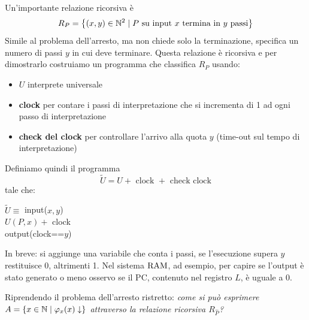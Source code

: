 Un'importante relazione ricorsiva è
$$ R_P = \left\{(x,y) \in \mathbb{N}^2 \mid P \text{ su input } x \text{ termina in } y \text{ passi}\right\} $$
Simile al problema dell'arresto, ma non chiede solo la terminazione, specifica un numero di passi $y$ in cui deve terminare. Questa relazione è ricorsiva e per dimostrarlo costruiamo un programma che classifica $R_P$ usando:
\begin{itemize}
	\item $U$ interprete universale
	\item \textbf{clock} per contare i passi di interpretazione che si incrementa di 1 ad ogni passo di interpretazione
	\item \textbf{check del clock} per controllare l'arrivo alla quota $y$ (time-out sul tempo di interpretazione)
\end{itemize}

Definiamo quindi il programma
$$ \tilde U = U + \text{ clock } + \text{ check clock}$$
tale che:
\begin{center}
	\begin{minipage}{.85\textwidth}
		\begin{tcolorbox}[colback=white,sharp corners,boxrule=.3mm]
\begin{algorithm}[H]
    \SetAlgoNoEnd
    \SetInd{1em}{1em}

    $\tilde U \equiv$ input($x,y$) \\
    $U(P,x) + $ clock \\
    output(clock==$y$) \\
\end{algorithm}

		\end{tcolorbox}
	\end{minipage}
\end{center}

In breve: si aggiunge una variabile che conta i passi, se l'esecuzione supera $y$ restituisce 0, altrimenti 1. Nel sistema $\text{RAM}$, ad esempio, per capire se l'output è stato generato o meno osservo se il PC, contenuto nel registro $L$, è uguale a 0.

Riprendendo il problema dell'arresto ristretto: \textit{come si può esprimere $A = \left\{x \in \mathbb{N} \mid \varphi_x (x) \downarrow\right\}$ attraverso la relazione ricorsiva $R_{\hat{P}}$?}

